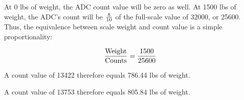 





At 0 lbs of weight, the ADC count value will be zero as well.  At 1500 lbs of weight, the ADC's count will be $8 \over 10$ of the full-scale value of 32000, or 25600.  Thus, the equivalence between scale weight and count value is a simple proportionality:

$${\hbox{Weight} \over \hbox{Counts}} = {1500 \over 25600}$$

\vskip 10pt

A count value of 13422 therefore equals 786.44 lbs of weight.

\vskip 10pt

A count value of 13753 therefore equals 805.84 lbs of weight.




